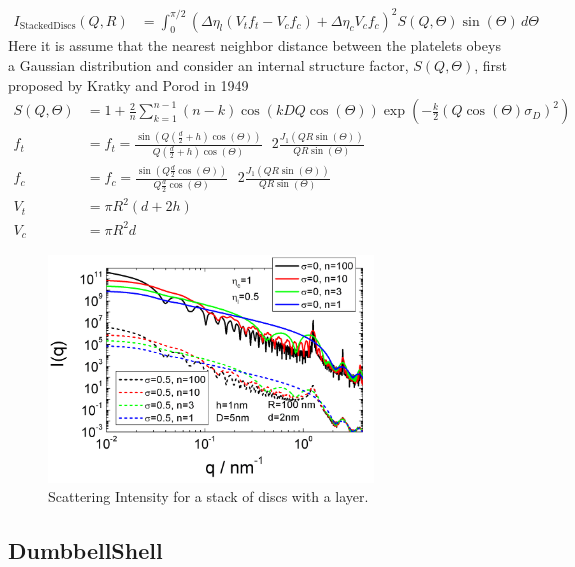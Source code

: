 \begin{align}
I_\text{StackedDiscs}(Q,R)&= \int_0^{\pi/2}\left( \Delta\eta_l
\left(V_t f_t - V_c f_c\right) + \Delta\eta_c  V_c f_c \right)^2
S(Q,\Theta) \sin(\Theta)\, d\Theta
\end{align}
Here it is assume that the nearest neighbor distance between the
platelets obeys a Gaussian distribution and consider an internal
structure factor, $S(Q,\Theta)$, first proposed by Kratky and Porod
in 1949 \cite{Kratky1949}
\begin{align}
S(Q,\Theta) &=  1+\frac{2}{n} \sum_{k=1}^{n-1} (n-k)
\cos(kDQ\cos(\Theta))
     \exp\left(-\frac{k}{2}\left(Q\cos(\Theta) \sigma_D\right)^2\right) \\
f_t &= f_t = \frac{\sin\left(Q(\frac{d}{2}+h)\cos(\Theta)\right)}{Q(\frac{d}{2}+h)\cos(\Theta)} \,\,\,\,2\frac{J_1(QR\sin(\Theta))}{QR\sin(\Theta)} \\
f_c &= f_c = \frac{\sin\left(Q\frac{d}{2}\cos(\Theta)\right)}{Q\frac{d}{2}\cos(\Theta)} \,\,\,\,2\frac{J_1(QR\sin(\Theta))}{QR\sin(\Theta)}\\
V_t &= \pi R^2 (d+2h)\\
V_c &= \pi R^2 d
\end{align}


\begin{figure}[htb]
\begin{center}
\includegraphics[width=0.768\textwidth]{../images/form_factor/cluster/StackedDiscsIQ.png}
\end{center}
\caption{Scattering Intensity for a stack of discs with a layer.}
\label{fig:StackedDiscs}
\end{figure}


\clearpage
\subsection{DumbbellShell}
\label{sect:DumbbellShell}
~\\

